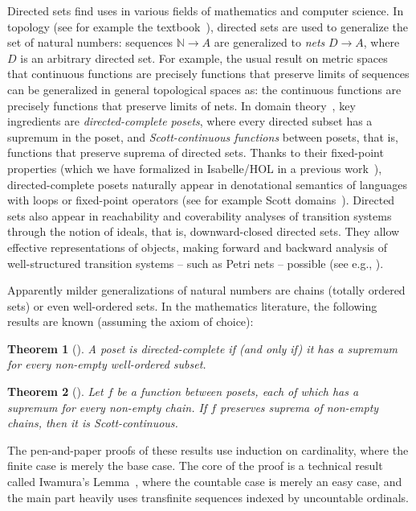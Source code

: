 \documentclass[11pt,a4paper]{article}
\newcommand\Nat{\mathbb{N}}
\newtheorem{theorem}{Theorem}
\begin{document}
Directed sets find uses in various fields of mathematics and computer science.
In topology (see for example the textbook~\cite{goubault13}), directed sets are used to generalize the set of natural numbers: sequences $\Nat \to A$ are generalized to \emph{nets} $D \to A$, where $D$ is an arbitrary directed set.
For example, the usual result on metric spaces that continuous functions are precisely 
functions that preserve limits of sequences can be generalized in general topological spaces
as: the continuous functions are precisely functions that preserve limits of nets.
In domain theory~\cite{abramski94}, key ingredients are \emph{directed-complete posets}, where every directed subset has a supremum in the poset, and
\emph{Scott-continuous functions} between posets, that is, functions that preserve suprema of directed sets.
Thanks to their fixed-point properties (which we have formalized in Isabelle/HOL in a previous work~\cite{DubutY22}),
directed-complete posets naturally appear in 
denotational semantics of languages with loops or fixed-point operators (see for example
Scott domains~\cite{scott70,winskel93}).
Directed sets also appear in reachability and coverability analyses of transition systems through the 
notion of ideals, that is, downward-closed directed sets. They allow effective 
representations of objects, making forward and backward analysis of well-structured 
transition systems -- such as Petri nets -- possible (see e.g., \cite{finkel09}).

Apparently milder generalizations of natural numbers are chains (totally ordered sets) or even well-ordered sets.
In the mathematics literature, the following results are known
(assuming the axiom of choice):

\begin{theorem}[\cite{Cohn65}]
\label{thm:comp}
A poset is directed-complete if (and only if) it has a supremum for every non-empty well-ordered subset.
\end{theorem}

\begin{theorem}[\cite{markowsky76}]\label{thm:cont}
Let $f$ be a function between posets, each of which has a supremum for every non-empty chain.
If $f$ preserves suprema of non-empty chains, then it is Scott-continuous.
\end{theorem}

The pen-and-paper proofs of these results use induction on cardinality, where the finite case is merely the base case.
The core of the proof is a technical result called Iwamura's Lemma~\cite{iwamura},
where the countable case is merely an easy case,
and the main part heavily uses transfinite sequences indexed by uncountable ordinals.
\end{document}
